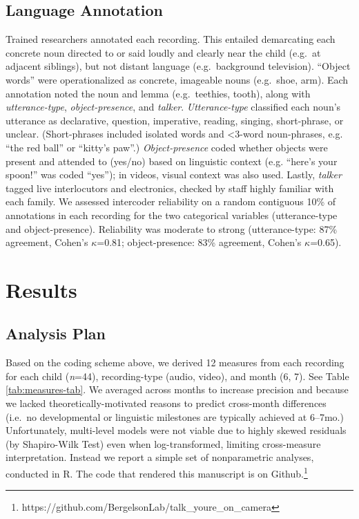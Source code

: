 \documentclass[man]{apa6}
\theoremstyle{definition}
\theoremstyle{definition}
\theoremstyle{definition}
\theoremstyle{remark}
\begin{document}
\subsection{Language Annotation}\label{language-annotation}

Trained researchers annotated each recording. This entailed demarcating
each concrete noun directed to or said loudly and clearly near the child
(e.g.~at adjacent siblings), but not distant language (e.g.~background
television). \enquote{Object words} were operationalized as concrete,
imageable nouns (e.g.~shoe, arm). Each annotation noted the noun and
lemma (e.g.~teethies, tooth), along with \emph{utterance-type},
\emph{object-presence}, and \emph{talker}. \emph{Utterance-type}
classified each noun's utterance as declarative, question, imperative,
reading, singing, short-phrase, or unclear. (Short-phrases included
isolated words and \textless{}3-word noun-phrases, e.g. \enquote{the red
ball} or \enquote{kitty's paw}.) \emph{Object-presence} coded whether
objects were present and attended to (yes/no) based on linguistic
context (e.g. \enquote{here's your spoon!} was coded \enquote{yes}); in
videos, visual context was also used. Lastly, \emph{talker} tagged live
interlocutors and electronics, checked by staff highly familiar with
each family. We assessed intercoder reliability on a random contiguous
10\% of annotations in each recording for the two categorical variables
(utterance-type and object-presence). Reliability was moderate to strong
(utterance-type: 87\% agreement, Cohen's \(\kappa\)=0.81;
object-presence: 83\% agreement, Cohen's \(\kappa\)=0.65).

\section{Results}\label{results}

\subsection{Analysis Plan}\label{analysis-plan}

Based on the coding scheme above, we derived 12 measures from each
recording for each child (\emph{n}=44), recording-type (audio, video),
and month (6, 7). See Table \ref{tab:measures-tab}. We averaged across
months to increase precision and because we lacked
theoretically-motivated reasons to predict cross-month differences
(i.e.~no developmental or linguistic milestones are typically achieved
at 6--7mo.) Unfortunately, multi-level models were not viable due to
highly skewed residuals (by Shapiro-Wilk Test) even when
log-transformed, limiting cross-measure interpretation. Instead we
report a simple set of nonparametric analyses, conducted in R. The code
that rendered this manuscript is on
Github.\footnote{https://github.com/BergelsonLab/talk\_youre\_on\_camera}
\end{document}
